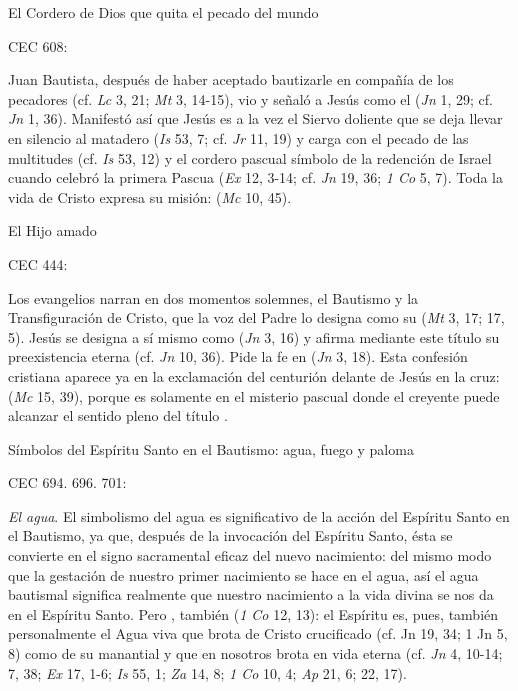 	El Cordero de Dios que quita el pecado del mundo
	
	CEC 608:
	
	 Juan Bautista, después de haber aceptado bautizarle en compañía de los pecadores (cf. \emph{Lc} 3, 21; \emph{Mt} 3, 14-15), vio y señaló a Jesús como el  (\emph{Jn} 1, 29; cf. \emph{Jn} 1, 36). Manifestó así que Jesús es a la vez el Siervo doliente que se deja llevar en silencio al matadero (\emph{Is} 53, 7; cf. \emph{Jr} 11, 19) y carga con el pecado de las multitudes (cf. \emph{Is} 53, 12) y el cordero pascual símbolo de la redención de Israel cuando celebró la primera Pascua (\emph{Ex} 12, 3-14; cf. \emph{Jn} 19, 36; \emph{1 Co} 5, 7). Toda la vida de Cristo expresa su misión:  (\emph{Mc} 10, 45).
	
	El Hijo amado
	
	CEC 444:
	
	 Los evangelios narran en dos momentos solemnes, el Bautismo y la Transfiguración de Cristo, que la voz del Padre lo designa como su  (\emph{Mt} 3, 17; 17, 5). Jesús se designa a sí mismo como  (\emph{Jn} 3, 16) y afirma mediante este título su preexistencia eterna (cf. \emph{Jn} 10, 36). Pide la fe en  (\emph{Jn} 3, 18). Esta confesión cristiana aparece ya en la exclamación del centurión delante de Jesús en la cruz:  (\emph{Mc} 15, 39), porque es solamente en el misterio pascual donde el creyente puede alcanzar el sentido pleno del título .
	
	Símbolos del Espíritu Santo en el Bautismo: agua, fuego y paloma
	
	CEC 694. 696. 701:
	
	 \emph{El agua}. El simbolismo del agua es significativo de la acción del Espíritu Santo en el Bautismo, ya que, después de la invocación del Espíritu Santo, ésta se convierte en el signo sacramental eficaz del nuevo nacimiento: del mismo modo que la gestación de nuestro primer nacimiento se hace en el agua, así el agua bautismal significa realmente que nuestro nacimiento a la vida divina se nos da en el Espíritu Santo. Pero , también  (\emph{1 Co} 12, 13): el Espíritu es, pues, también personalmente el Agua viva que brota de Cristo crucificado (cf. Jn 19, 34; 1 Jn 5, 8) como de su manantial y que en nosotros brota en vida eterna (cf. \emph{Jn} 4, 10-14; 7, 38; \emph{Ex} 17, 1-6; \emph{Is} 55, 1; \emph{Za} 14, 8; \emph{1 Co} 10, 4; \emph{Ap} 21, 6; 22, 17).
	
